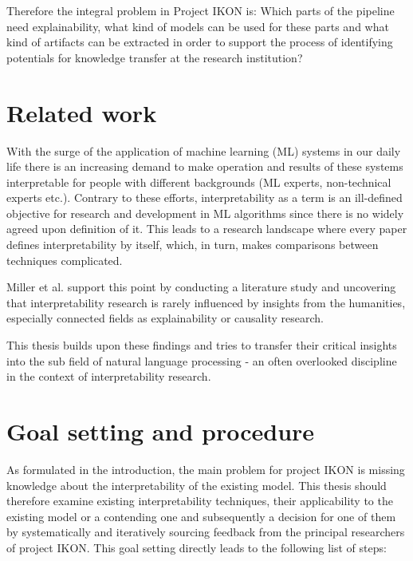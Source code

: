 \documentclass[pdftex,a4paper,12pt]{scrartcl}
\begin{document}
Therefore the integral problem in Project IKON is: Which parts of the pipeline need explainability, what kind of models can be used for these parts and what kind of artifacts can be extracted in order to support the process of identifying potentials for knowledge transfer at the research institution?

\section{Related work}

With the surge of the application of machine learning (ML) systems in our daily life there is an increasing demand to make operation and results of these systems interpretable for people with different backgrounds (ML experts, non-technical experts etc.). Contrary to these efforts, interpretability as a term is an ill-defined objective \cite{liptonMythosModelInterpretability2016a}  for research and development in ML algorithms since there is no widely agreed upon definition of it. This leads to a research landscape where every paper defines interpretability by itself, which, in turn, makes comparisons between techniques complicated. 

Miller et al. \cite{millerExplainableAIBeware2017} support this point by conducting a literature study and uncovering that interpretability research is rarely influenced by insights from the humanities, especially connected fields as explainability or causality research.

This thesis builds upon these findings  and tries to transfer their critical insights into the sub field of natural language processing - an often overlooked discipline in the context of interpretability research.

\section{Goal setting and procedure} 
As formulated in the introduction, the main problem for project IKON is missing knowledge about the interpretability of the existing model. This thesis should therefore examine existing interpretability techniques, their applicability to the existing model or a contending one and subsequently a decision for one of them by systematically and iteratively sourcing feedback from the principal researchers of project IKON. This goal setting directly leads to the following list of steps:
\end{document}
